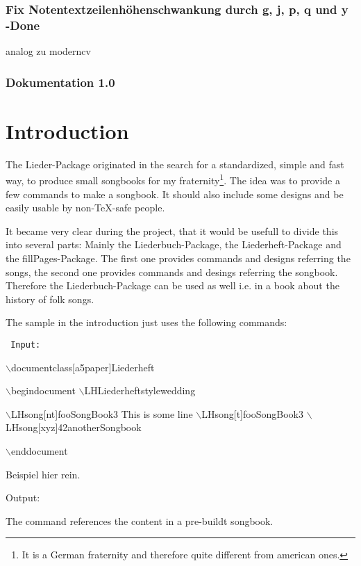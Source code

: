 \documentclass[12pt,a4paper]{scrreprt}
\begin{document}
\subsection{Fix Notentextzeilenhöhenschwankung durch g, j, p, q und y -Done}

analog zu moderncv
\subsection{Dokumentation 1.0}


\chapter{Introduction}
\label{xy}
The Lieder-Package originated in the search for a standardized, simple and fast way, to produce small songbooks for my fraternity\footnote{It is a German fraternity and therefore quite different from american ones.}. The idea was to provide a few commands to make a songbook. It should also include some designs and be easily usable by \mbox{non-\TeX -safe} people.

It became very clear during the project, that it would be usefull to divide this into several parts: Mainly the Liederbuch-Package, the Liederheft-Package and the fillPages-Package. The first one provides commands and designs referring the songs, the second one provides commands and desings referring the songbook. Therefore the Liederbuch-Package can be used as well i.e. in a book about the history of folk songs.

The sample in the introduction just uses the following commands:

\begin{minipage}{0.5\textwidth}
{
\def\bsl{$\backslash$}

\texttt{
Input:}
{

\bsl documentclass[a5paper]{Liederheft}

\bsl begin{document}
\bsl LHLiederheftstyle{wedding}

\bsl LHsong[nt]{fooSongBook}{3} %
This is some line
\bsl LHsong[t]{fooSongBook}{3}
\bsl LHsong[xyz]{42}{anotherSongbook}

\bsl end{document}

Beispiel hier rein.

Output:
}}
\end{minipage}

The command references the content in a pre-buildt songbook. 
\end{document}
